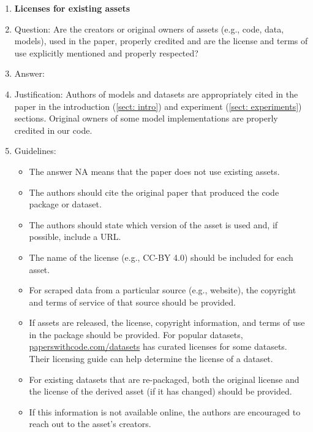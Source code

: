 \documentclass{article}
\theoremstyle{plain}
\theoremstyle{definition}
\theoremstyle{remark}
\begin{document}
\begin{enumerate}
\item {\bf Licenses for existing assets}
    \item[] Question: Are the creators or original owners of assets (e.g., code, data, models), used in the paper, properly credited and are the license and terms of use explicitly mentioned and properly respected?
    \item[] Answer: \answerYes{} %
    \item[] Justification: Authors of models and datasets are appropriately cited in the paper in the introduction (\ref{sect: intro}) and experiment (\ref{sect: experiments}) sections. Original owners of some model implementations are properly credited in our code. 
    \item[] Guidelines:
    \begin{itemize}
        \item The answer NA means that the paper does not use existing assets.
        \item The authors should cite the original paper that produced the code package or dataset.
        \item The authors should state which version of the asset is used and, if possible, include a URL.
        \item The name of the license (e.g., CC-BY 4.0) should be included for each asset.
        \item For scraped data from a particular source (e.g., website), the copyright and terms of service of that source should be provided.
        \item If assets are released, the license, copyright information, and terms of use in the package should be provided. For popular datasets, \url{paperswithcode.com/datasets} has curated licenses for some datasets. Their licensing guide can help determine the license of a dataset.
        \item For existing datasets that are re-packaged, both the original license and the license of the derived asset (if it has changed) should be provided.
        \item If this information is not available online, the authors are encouraged to reach out to the asset's creators.
    \end{itemize}


\end{enumerate}
\end{document}
